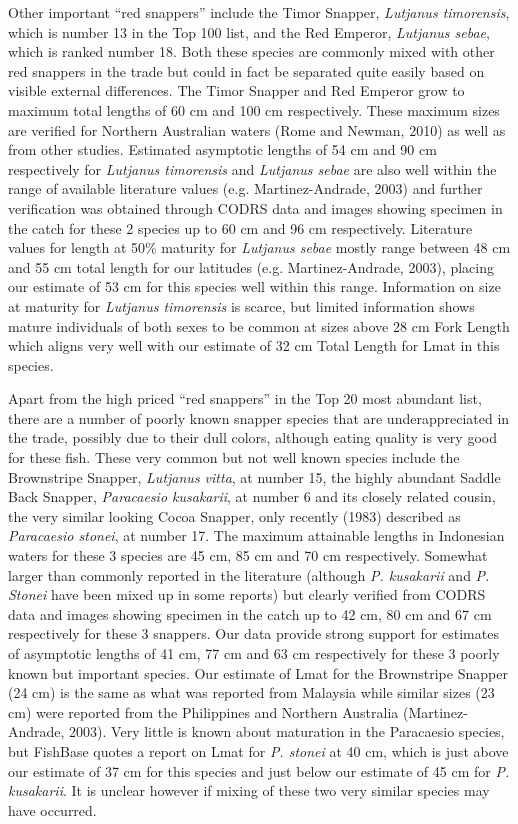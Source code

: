 Other important ``red snappers'' include the Timor Snapper, \textit{Lutjanus timorensis}, which is number 13 in the Top 100 list, and the Red Emperor, \textit{Lutjanus sebae}, which is ranked number 18. Both these species are commonly mixed with other red snappers in the trade but could in fact be separated quite easily based on visible external differences. The Timor Snapper and Red Emperor grow to maximum total lengths of 60 cm and 100 cm respectively. These maximum sizes are verified for Northern Australian waters (Rome and Newman, 2010) as well as from other studies. Estimated asymptotic lengths of 54 cm and 90 cm respectively for \textit{Lutjanus timorensis} and \textit{Lutjanus sebae} are also well within the range of available literature values (e.g. Martinez-Andrade, 2003) and further verification was obtained through CODRS data and images showing specimen in the catch for these 2 species up to 60 cm and 96 cm respectively. Literature values for length at 50\% maturity for \textit{Lutjanus sebae} mostly range between 48 cm and 55 cm total length for our latitudes (e.g. Martinez-Andrade, 2003), placing our estimate of 53 cm for this species well within this range. Information on size at maturity for \textit{Lutjanus timorensis} is scarce, but limited information shows mature individuals of both sexes to be common at sizes above 28 cm Fork Length which aligns very well with our estimate of 32 cm Total Length for Lmat in this species.

Apart from the high priced ``red snappers'' in the Top 20 most abundant list, there are a number of poorly known snapper species that are underappreciated in the trade, possibly due to their dull colors, although eating quality is very good for these fish. These very common but not well known species include the Brownstripe Snapper, \textit{Lutjanus vitta}, at number 15, the highly abundant Saddle Back Snapper, \textit{Paracaesio kusakarii}, at number 6 and its closely related cousin, the very similar looking Cocoa Snapper, only recently (1983) described as \textit{Paracaesio stonei}, at number 17. The maximum attainable lengths in Indonesian waters for these 3 species are 45 cm, 85 cm and 70 cm respectively. Somewhat larger than commonly reported in the literature (although \textit{P. kusakarii} and \textit{P. Stonei} have been mixed up in some reports) but clearly verified from CODRS data and images showing specimen in the catch up to 42 cm, 80 cm and 67 cm respectively for these 3 snappers. Our data provide strong support for estimates of asymptotic lengths of 41 cm, 77 cm and 63 cm respectively for these 3 poorly known but important species. Our estimate of Lmat for the Brownstripe Snapper (24 cm) is the same as what was reported from Malaysia while similar sizes (23 cm) were reported from the Philippines and Northern Australia (Martinez-Andrade, 2003). Very little is known about maturation in the Paracaesio species, but FishBase quotes a report on Lmat for \textit{P. stonei} at 40 cm, which is just above our estimate of 37 cm for this species and just below our estimate of 45 cm for \textit{P. kusakarii}. It is unclear however if mixing of these two very similar species may have occurred.


